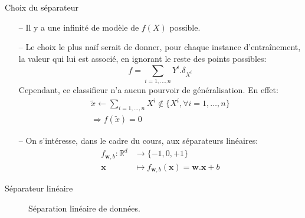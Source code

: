 \documentclass[9pt]{beamer}
\begin{document}
	\begin{frame}{Choix du séparateur}
		\begin{itemize}
			\item[--] Il y a une infinité de modèle de $f(X)$ possible.
			\item[--] Le choix le plus naïf serait de donner, pour chaque instance d'entraînement, la valeur qui lui est associé, en ignorant le reste des points possibles:
			\begin{equation*}
				f = \sum_{i=1,\dots,n} Y^i . \delta_{X^i}
			\end{equation*}
			Cependant, ce classifieur n'a aucun pourvoir de généralisation. En effet:
			\begin{gather*}
				\widetilde{x} \leftarrow \sum_{i=1,\dots,n} X^i \notin \{X^i, \forall i=1,\dots,n\} \\
				\Rightarrow f(\widetilde{x}) = 0
			\end{gather*}
			\item[--] On s'intéresse, dans le cadre du cours, aux séparateurs linéaires:
			\begin{align*}
				f_{\textbf{w}, b}: \mathbb{R}^d &\rightarrow \{-1, 0, +1\} \\
				\textbf{x} &\mapsto f_{\textbf{w}, b}(\textbf{x}) = \textbf{w}.\textbf{x} + b
			\end{align*}
		\end{itemize}
	\end{frame}

	\begin{frame}{Séparateur linéaire}
		\begin{figure}[H]
			{
				\caption{\label{fig::lin_separators} Séparation linéaire de données.}
			}
		\end{figure}
	\end{frame}
\end{document}
